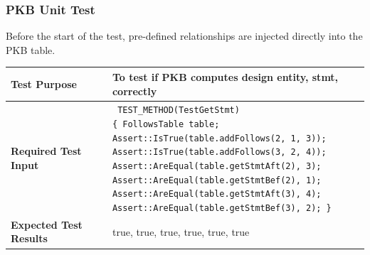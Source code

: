 \documentclass[12pt]{article}
\begin{document}
{{{{{{{{{{{{{\subsubsection{PKB Unit Test}
Before the start of the test, pre-defined relationships are injected directly into the PKB table.


\begin{longtable}{|L{5cm} | L{12cm}| }
\hline
\textbf{Test Purpose} &
To test if PKB computes design entity, stmt,  correctly
\\\hline
\textbf{Required Test Input}
 &
 \texttt{
 \noindent TEST\_METHOD(TestGetStmt)
\newline \vspace{2mm}
 \{ \hspace{4mm} FollowsTable table; \newline \vspace{2mm}
 \hspace{9mm} Assert::IsTrue(table.addFollows(2, 1, 3)); \newline 
 \hspace{9mm} Assert::IsTrue(table.addFollows(3, 2, 4));\newline 
 \hspace{9mm} Assert::AreEqual(table.getStmtAft(2), 3);\newline 
 \hspace{9mm} Assert::AreEqual(table.getStmtBef(2), 1);\newline 
 \hspace{9mm} Assert::AreEqual(table.getStmtAft(3), 4);\newline 
 \hspace{9mm} Assert::AreEqual(table.getStmtBef(3), 2); \} }

 \\\hline
   \textbf{ Expected Test Results} &
true, true, true, true, true, true \\\hline
\end{longtable}

}}}}}}}}}}}}}
\end{document}
